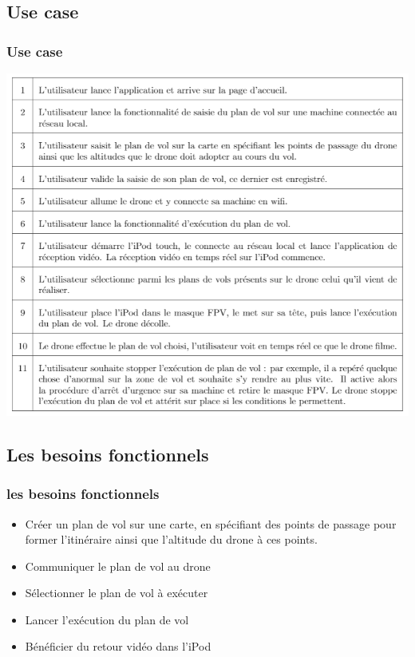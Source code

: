 \documentclass{beamer}
\begin{document}
	\begin{frame}
	\section{Use case}
		\begin{center}
		\frametitle{Use case}
        \includegraphics[scale=0.5]{Use_Case.PNG}
       \end{center}
	\end{frame}
	\begin{frame}
	\section{Les besoins fonctionnels}
		\begin{center}
		\frametitle{les besoins fonctionnels}
		\begin{itemize}
		    \item Créer un plan de vol sur une carte, en spécifiant des points de passage pour former l'itinéraire ainsi que l'altitude du drone à ces points.
		    \item Communiquer le plan de vol au drone
		    \item Sélectionner le plan de vol à exécuter
		    \item Lancer l'exécution du plan de vol
		    \item Bénéficier du retour vidéo dans l'iPod
		\end{itemize}
		\end{center}
	\end{frame}
\end{document}
